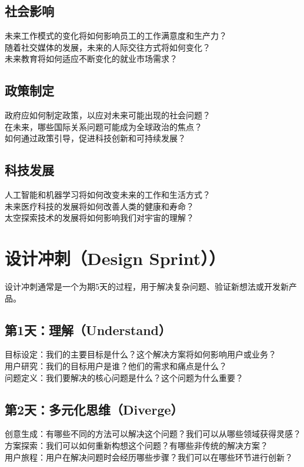 \documentclass[12pt]{book}
\begin{document}
\subsection{社会影响}
未来工作模式的变化将如何影响员工的工作满意度和生产力？\\
随着社交媒体的发展，未来的人际交往方式将如何变化？\\
未来教育将如何适应不断变化的就业市场需求？\\

\subsection{政策制定}
政府应如何制定政策，以应对未来可能出现的社会问题？\\
在未来，哪些国际关系问题可能成为全球政治的焦点？\\
如何通过政策引导，促进科技创新和可持续发展？\\

\subsection{科技发展}
人工智能和机器学习将如何改变未来的工作和生活方式？\\
未来医疗科技的发展将如何改善人类的健康和寿命？\\
太空探索技术的发展将如何影响我们对宇宙的理解？\\


\section{设计冲刺（Design Sprint））}
设计冲刺通常是一个为期5天的过程，用于解决复杂问题、验证新想法或开发新产品。
\subsection{第1天：理解（Understand）}
目标设定：我们的主要目标是什么？这个解决方案将如何影响用户或业务？\\
用户研究：我们的目标用户是谁？他们的需求和痛点是什么？\\
问题定义：我们要解决的核心问题是什么？这个问题为什么重要？\\

\subsection{第2天：多元化思维（Diverge）}
创意生成：有哪些不同的方法可以解决这个问题？我们可以从哪些领域获得灵感？\\
方案探索：我们可以如何重新构想这个问题？有哪些非传统的解决方案？\\
用户旅程：用户在解决问题时会经历哪些步骤？我们可以在哪些环节进行创新？\\
\end{document}
